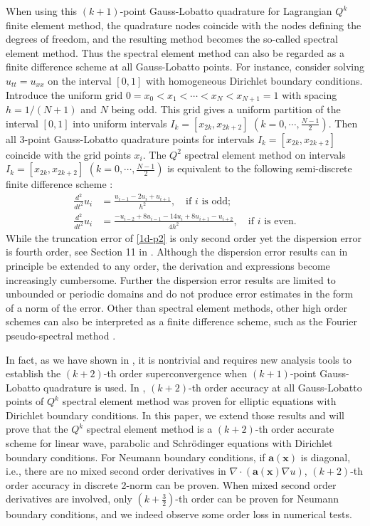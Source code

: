 \documentclass[onefignum,onetabnum]{siamart171218}
\begin{document}
When using this $(k+1)$-point Gauss-Lobatto quadrature for Lagrangian  $Q^k$  finite element method,  the quadrature nodes coincide with the nodes defining the degrees of freedom,  and the resulting method becomes the so-called spectral element method.  Thus the spectral element method can also be regarded as a finite difference   scheme at all Gauss-Lobatto points. For instance, consider solving $u_{tt}=u_{xx}$ on the interval $[0,1]$ with homogeneous Dirichlet boundary conditions.  Introduce the  uniform grid $0=x_0<x_1<\cdots<x_N<x_{N+1}=1$ with spacing $h = 1/(N+1)$ and $N$ being odd. This grid  gives a uniform partition of the interval $[0,1]$ into uniform intervals $I_k=[x_{2k}, x_{2k+2}]$ $(k=0,\cdots, \frac{N-1}{2})$.  
Then all 3-point Gauss-Lobatto  quadrature points for  intervals $I_k=[x_{2k}, x_{2k+2}]$   coincide with  the grid points $x_i$. 
The  $Q^2$ spectral element method on  intervals $I_k=[x_{2k}, x_{2k+2}]$ $(k=0,\cdots, \frac{N-1}{2})$ is equivalent to the following semi-discrete finite difference scheme \cite{cohen2001higher,li2020superconvergence}:
\begin{subequations}
\label{1d-p2}
\begin{align}
\frac{d^2}{dt^2}u_i &=\frac{u_{i-1}-2u_i+u_{i+1}}{h^2},\quad \mbox{if $i$ is odd;}\\
\frac{d^2}{dt^2}u_i &=\frac{-u_{i-2}+8u_{i-1}-14u_i+8u_{i+1}-u_{i+2}}{4h^2},\quad \mbox{if $i$ is even.}
\end{align}
\end{subequations}
While the truncation error of \eqref{1d-p2} is only second order yet the dispersion error is fourth order, see Section 11 in \cite{cohen2001higher}. Although the dispersion error results can in principle be extended to any order, the derivation and expressions become increasingly cumbersome. Further the dispersion error results are limited to unbounded or periodic domains and do not produce error estimates in the form of a norm of the error.  
{ Other than spectral element methods,
other high order schemes can also be interpreted as a finite difference scheme, such as 
the Fourier pseudo-spectral method \cite{CiCP-26-1335, gottlieb2012stability, cheng2015fourier}.}
 

In fact, as we have shown in \cite{li2020superconvergence},  it is nontrivial and requires new analysis tools to establish the $(k+2)$-th order superconvergence when $(k+1)$-point Gauss-Lobatto quadrature is used.   In \cite{li2020superconvergence},  $(k+2)$-th order accuracy at all Gauss-Lobatto points of $Q^k$ spectral element method was proven for elliptic equations with Dirichlet boundary conditions. In this paper, we  extend those results and  will prove  that the $Q^k$ spectral element method is a  $(k+2)$-th order accurate  scheme for linear wave, parabolic and  Schr\"{o}dinger equations  with Dirichlet boundary conditions. For Neumann boundary conditions, if $\mathbf a(\mathbf x)$ is diagonal, i.e., there are no mixed second order derivatives in $\nabla\cdot(\mathbf a(\mathbf x) \nabla u)$, 
$(k+2)$-th order accuracy in discrete 2-norm can be proven. When mixed second order derivatives are involved,
only $(k+\frac32)$-th order can be proven for Neumann boundary conditions, and we indeed observe some order loss in numerical tests.
 
\end{document}
